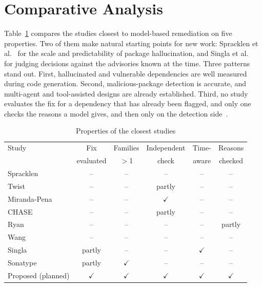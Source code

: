 \documentclass[conference]{IEEEtran}
\begin{document}
\section{Comparative Analysis}
\label{sec:compare}
Table~\ref{tab:compare} compares the studies closest to model-based remediation on five properties. Two of them make
natural starting points for new work: Spracklen et al.~\cite{spracklen2025} for the scale and predictability of
package hallucination, and Singla et al.~\cite{singla2026} for judging decisions against the advisories known at
the time. Three patterns stand out. First, hallucinated and vulnerable dependencies are well measured during code
generation. Second, malicious-package detection is accurate, and multi-agent and tool-assisted designs are already
established. Third, no study evaluates the fix for a dependency that has already been flagged, and only one checks
the reasons a model gives, and then only on the detection side~\cite{ryan2026}.

\begin{table}[t]
\caption{Properties of the closest studies}
\label{tab:compare}
\centering
\small
\setlength{\tabcolsep}{3pt}
\begin{tabular}{@{}lccccc@{}}
\toprule
Study & Fix & Families & Independent & Time- & Reasons \\
 & evaluated & $>$1 & check & aware & checked \\
\midrule
Spracklen~\cite{spracklen2025} & -- & -- & -- & -- & -- \\
Twist~\cite{twist2026} & -- & -- & partly & -- & -- \\
Miranda-Pena~\cite{mirandapena2026} & -- & -- & $\checkmark$ & -- & -- \\
CHASE~\cite{toda2025} & -- & -- & partly & -- & -- \\
Ryan~\cite{ryan2026} & -- & -- & -- & -- & partly \\
Wang~\cite{wang2026} & -- & -- & -- & -- & -- \\
Singla~\cite{singla2026} & partly & -- & -- & $\checkmark$ & -- \\
Sonatype~\cite{sonatype2026} & partly & $\checkmark$ & -- & -- & -- \\
\midrule
Proposed (planned) & $\checkmark$ & $\checkmark$ & $\checkmark$ & $\checkmark$ & $\checkmark$ \\
\bottomrule
\end{tabular}
\end{table}
\end{document}
